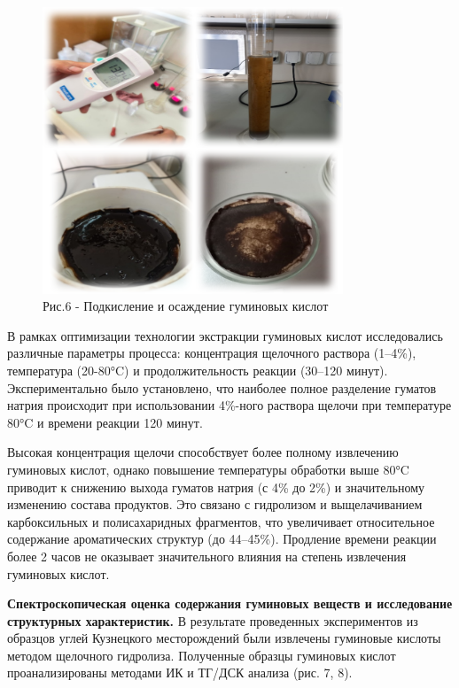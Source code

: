 \begin{figure}[H]
	\centering
	\includegraphics[width=0.8\textwidth]{media/gorn3/image20}
	\caption*{Рис.6 - Подкисление и осаждение гуминовых кислот}
\end{figure}

\begin{multicols}{2}
В рамках оптимизации технологии экстракции гуминовых кислот
исследовались различные параметры процесса: концентрация щелочного
раствора (1--4\%), температура (20-80°C) и продолжительность реакции
(30--120 минут). Экспериментально было установлено, что наиболее полное
разделение гуматов натрия происходит при использовании 4\%-ного раствора
щелочи при температуре 80°C и времени реакции 120 минут.

Высокая концентрация щелочи способствует более полному извлечению
гуминовых кислот, однако повышение температуры обработки выше 80°C
приводит к снижению выхода гуматов натрия (с 4\% до 2\%) и значительному
изменению состава продуктов. Это связано с гидролизом и выщелачиванием
карбоксильных и полисахаридных фрагментов, что увеличивает относительное
содержание ароматических структур (до 44--45\%). Продление времени
реакции более 2 часов не оказывает значительного влияния на степень
извлечения гуминовых кислот.

{\bfseries Спектроскопическая оценка содержания гуминовых веществ и
исследование структурных характеристик.} В результате проведенных
экспериментов из образцов углей Кузнецкого месторождений были извлечены
гуминовые кислоты методом щелочного гидролиза. Полученные образцы
гуминовых кислот проанализированы методами ИК и ТГ/ДСК анализа (рис. 7,
8).
\end{multicols}

